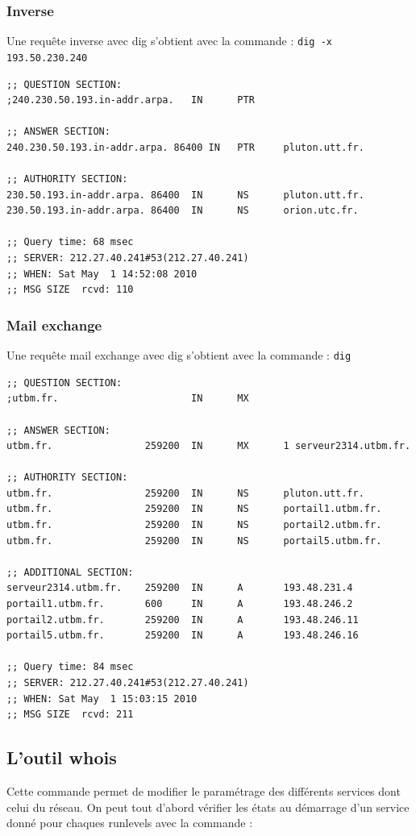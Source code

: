 \documentclass[12pt,a4paper,notitlepage]{article}
\begin{document}
\subsubsection{Inverse}
Une requête inverse avec dig s'obtient avec la commande : \texttt{dig -x 193.50.230.240}\\
\begin{lstlisting}
;; QUESTION SECTION:
;240.230.50.193.in-addr.arpa.   IN      PTR

;; ANSWER SECTION:
240.230.50.193.in-addr.arpa. 86400 IN   PTR     pluton.utt.fr.

;; AUTHORITY SECTION:
230.50.193.in-addr.arpa. 86400  IN      NS      pluton.utt.fr.
230.50.193.in-addr.arpa. 86400  IN      NS      orion.utc.fr.

;; Query time: 68 msec
;; SERVER: 212.27.40.241#53(212.27.40.241)
;; WHEN: Sat May  1 14:52:08 2010
;; MSG SIZE  rcvd: 110
\end{lstlisting}

\subsubsection{Mail exchange}
Une requête mail exchange avec dig s'obtient avec la commande : \texttt{dig }\\
\begin{lstlisting}
;; QUESTION SECTION:
;utbm.fr.                       IN      MX

;; ANSWER SECTION:
utbm.fr.                259200  IN      MX      1 serveur2314.utbm.fr.

;; AUTHORITY SECTION:
utbm.fr.                259200  IN      NS      pluton.utt.fr.
utbm.fr.                259200  IN      NS      portail1.utbm.fr.
utbm.fr.                259200  IN      NS      portail2.utbm.fr.
utbm.fr.                259200  IN      NS      portail5.utbm.fr.

;; ADDITIONAL SECTION:
serveur2314.utbm.fr.    259200  IN      A       193.48.231.4
portail1.utbm.fr.       600     IN      A       193.48.246.2
portail2.utbm.fr.       259200  IN      A       193.48.246.11
portail5.utbm.fr.       259200  IN      A       193.48.246.16

;; Query time: 84 msec
;; SERVER: 212.27.40.241#53(212.27.40.241)
;; WHEN: Sat May  1 15:03:15 2010
;; MSG SIZE  rcvd: 211
\end{lstlisting}


\clearpage
\subsection{L'outil whois}
Cette commande permet de modifier le paramétrage des différents services dont celui du réseau. On peut tout d'abord vérifier les états au démarrage d'un service donné pour chaques runlevels avec la commande :\\
\end{document}
